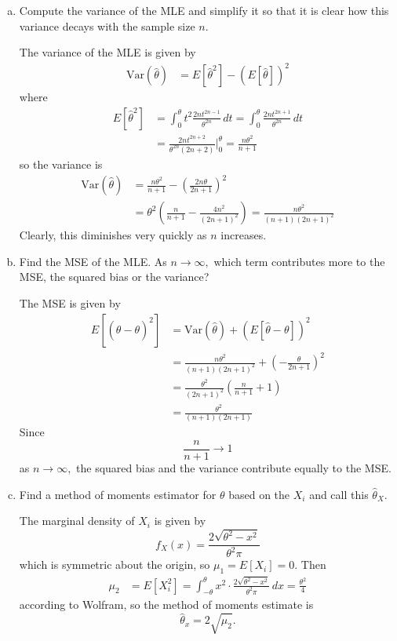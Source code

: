 \documentclass{article}
\newcommand{\var}{\mathrm{Var}}
\begin{document}
\begin{enumerate}
\begin{enumerate}[(a)]
			\item Compute the variance of the MLE and simplify it so that it is clear how this variance decays with the sample size $n.$
				\begin{soln}
					The variance of the MLE is given by 
					\begin{align*}
						\var(\hat{\theta}) &= E[\hat{\theta}^2]-(E[\hat{\theta}])^2 
					\end{align*} where 
					\begin{align*}
						E[\hat{\theta}^2] &= \int_0^\theta t^2 \frac{2nt^{2n-1}}{\theta^{2n}}\, dt = \int_0^\theta \frac{2nt^{2n+1}}{\theta^{2n}}\, dt \\
						&= \frac{2nt^{2n+2}}{\theta^{2n}(2n+2)}\bigg\vert_0^\theta = \frac{n\theta^2}{n+1}
					\end{align*} so the variance is 
					\begin{align*}
					\var(\hat{\theta}) &= \frac{n\theta^2}{n+1}-\left( \frac{2n\theta}{2n+1} \right)^2 \\ 
					&= \theta^2\left( \frac{n}{n+1}-\frac{4n^2}{(2n+1)^2} \right) = \frac{n\theta^2}{(n+1)(2n+1)^2}
					\end{align*} Clearly, this diminishes very quickly as $n$ increases.
					
				\end{soln}

			\item Find the MSE of the MLE. As $n\to\infty,$ which term contributes more to the MSE, the squared bias or the variance?
				\begin{soln}
					The MSE is given by 
					\begin{align*}
						E[(\hat{\theta}-\theta)^2] &= \var(\hat{\theta}) + \left( E[\hat{\theta}-\theta] \right)^2 \\
						&= \frac{n\theta^2}{(n+1)(2n+1)^2} + \left( -\frac{\theta}{2n+1} \right)^2 \\
						&\tag{1}=\frac{\theta^2}{(2n+1)^2}\left( \frac{n}{n+1}+1 \right) \\ 
						&= \frac{\theta^2}{(n+1)(2n+1)}
					\end{align*}
					Since \[\frac{n}{n+1}\to1\] as $n\to\infty,$ the squared bias and the variance contribute equally to the MSE.
					
				\end{soln}

			\item Find a method of moments estimator for $\theta$ based on the $X_i$ and call this $\hat{\theta}_X.$
				\begin{soln}
					The marginal density of $X_i$ is given by \[f_X(x)=\frac{2\sqrt{\theta^2-x^2}}{\theta^2\pi}\] which is symmetric about the origin, so $\mu_1=E[X_i]=0.$ Then
					\begin{align*}
						\mu_2 &= E[X_i^2] = \int_{-\theta}^\theta x^2\cdot\frac{2\sqrt{\theta^2-x^2}}{\theta^2\pi}\, dx = \frac{\theta^2}{4}
					\end{align*} according to Wolfram, so the method of moments estimate is \[\hat{\theta}_x=2\sqrt{\hat{\mu}_2}.\] 
				\end{soln}


\end{enumerate}
\end{enumerate}
\end{document}

